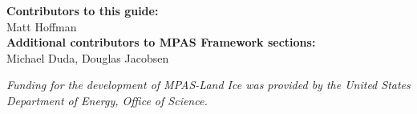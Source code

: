 \vspace{8pt}
\noindent
{\bf Contributors to this guide:}\\
Matt Hoffman\\
{\bf Additional contributors to MPAS Framework sections:}\\
Michael Duda, Douglas Jacobsen

\vspace{8pt}
\noindent
{\it Funding for the development of MPAS-Land Ice was provided by the United States Department of Energy, Office of Science.}




